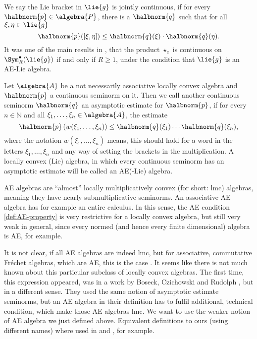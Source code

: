\documentclass[
11pt,                          %
english                        %
]{article}
\begin{document}
We say the Lie bracket in $\lie{g}$ is jointly continuous, if for every 
$\halbnorm{p} \in \algebra{P}$, there is a $\halbnorm{q}$ such that for all $\xi, 
\eta \in \lie{g}$
\begin{equation}
	\label{eq:continuity-of-liebracket}
	\halbnorm{p}([\xi, \eta])
	\leq
	\halbnorm{q}(\xi) \cdot \halbnorm{q}(\eta).
\end{equation}
It was one of the main results in \cite{esposito.stapor.waldmann:2015a:pre}, that 
the product $\star_z$ is continuous on $\Sym_R^{\bullet}(\lie{g})$ if and only if 
$R \geq 1$, under the condition that $\lie{g}$ is an AE-Lie algebra.
\begin{definition}[AE-algebra]
	\label{def:AE-algebra}
	Let $\algebra{A}$ be a not necessarily associative locally convex algebra
	and $\halbnorm{p}$ a continuous seminorm on it. Then we call
	another continuous seminorm $\halbnorm{q}$ an asymptotic estimate for 
	$\halbnorm{p}$, if for every $n \in \mathbb{N}$ and all $\xi_1, \ldots, \xi_n
	\in \algebra{A}$, the estimate
	\begin{equation}
		\label{eq:def:AE-property}
		\halbnorm{p}\left(
			w(\xi_1, \ldots, \xi_n)
		\right)
		\leq
		\halbnorm{q}(\xi_1) \cdots \halbnorm{q}(\xi_n),
	\end{equation}
	where the notation $w(\xi_1, \ldots, \xi_n)$ means, this should hold for a word 
	in the letters $\xi_1, \ldots, \xi_n$ and any
	way of setting the brackets in the multiplication. A locally convex (Lie) 
	algebra, in which every continuous seminorm has an asymptotic estimate will be 
	called an AE(-Lie) algebra.
\end{definition}
AE algebras are ``almost'' locally multiplicatively convex (for short: lmc) 
algebras, meaning they have nearly submultiplicative seminorms. An associative AE 
algebra has for example an entire calculus. In this sense, the AE condition 
\eqref{def:AE-property} is very restrictive for a locally convex algebra, but still 
very weak in general, since every normed (and hence every finite dimensional) algebra 
is AE, for example.

It is not clear, if all AE algebras are indeed lmc, but for associative, commutative 
Fr\'echet algebras, which are AE, this is the case 
\cite{mitiagin.rolewicz.zelazko:1962a}. It seems like there is not much known about 
this particular subclass of locally convex algebras. The first time, this expression 
appeared, was in a work by Boseck, Czichowski and Rudolph 
\cite{boseck.czichowski.rudoplh:1981a}, but in a different sense. They used the same 
notion of asymptotic estimate seminorms, but an AE algebra in their definition has to 
fulfil additional, technical condition, which make those AE algebras lmc. We want to 
use the weaker notion of AE algebra we just defined above. Equivalent definitions to 
ours (using different names) where used in \cite{gloeckner.neeb:2012a} and 
\cite{bogfjellmo.dahmen.schmedig:2015a}, for example.
\end{document}
